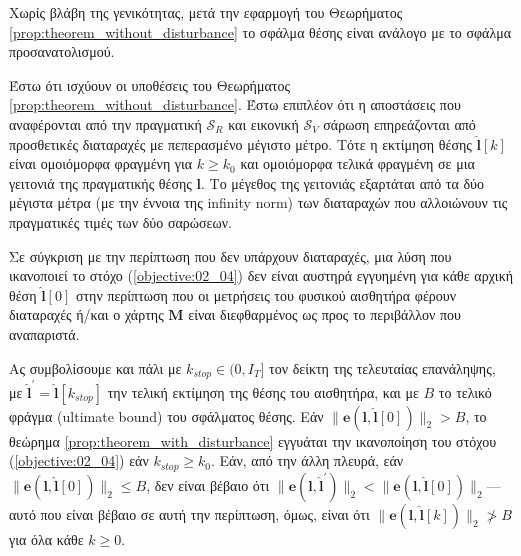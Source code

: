 \begin{gg_box}
\begin{remark}
  \label{remark:loc_prop_or}
  Χωρίς βλάβη της γενικότητας, μετά την εφαρμογή του Θεωρήματος
  \ref{prop:theorem_without_disturbance} το σφάλμα θέσης είναι ανάλογο με το
  σφάλμα προσανατολισμού.
\end{remark}
\end{gg_box}

\begin{bw_box}
\begin{theorem}
  \label{prop:theorem_with_disturbance}
  Έστω ότι ισχύουν οι υποθέσεις του Θεωρήματος
  \ref{prop:theorem_without_disturbance}. Έστω επιπλέον ότι η αποστάσεις που
  αναφέρονται από την πραγματική $\mathcal{S}_R$ και εικονική $\mathcal{S}_V$
  σάρωση επηρεάζονται από προσθετικές διαταραχές με πεπερασμένο μέγιστο μέτρο.
  Τότε η εκτίμηση θέσης $\hat{\bm{l}}[k]$ είναι ομοιόμορφα φραγμένη για $k \geq
  k_0$ και ομοιόμορφα τελικά φραγμένη σε μια γειτονιά της πραγματικής θέσης
  $\bm{l}$. Το μέγεθος της γειτονιάς εξαρτάται από τα δύο μέγιστα μέτρα
  (με την έννοια της infinity norm) των διαταραχών που αλλοιώνουν τις
  πραγματικές τιμές των δύο σαρώσεων.
\end{theorem}
\end{bw_box}

\begin{corollary}
  Σε σύγκριση με την περίπτωση που δεν υπάρχουν διαταραχές, μια λύση που
  ικανοποιεί το στόχο (\ref{objective:02_04}) δεν είναι αυστηρά εγγυημένη για
  κάθε αρχική θέση $\hat{\bm{l}}[0]$ στην περίπτωση που οι μετρήσεις του φυσικού
  αισθητήρα φέρουν διαταραχές ή/και ο χάρτης $\bm{M}$ είναι διεφθαρμένος ως προς
  το περιβάλλον που αναπαριστά.
\end{corollary}

Ας συμβολίσουμε και πάλι με $k_{stop} \in (0, I_T]$ τον δείκτη της τελευταίας
επανάληψης, με $\hat{\bm{l}}^{\prime} = \hat{\bm{l}}[k_{stop}]$ την τελική
εκτίμηση της θέσης του αισθητήρα, και με $B$ το τελικό φράγμα (ultimate bound)
του σφάλματος θέσης. Εάν $\|\bm{e}(\bm{l}, \hat{\bm{l}}[0])\|_2 > B$, το
θεώρημα \ref{prop:theorem_with_disturbance} εγγυάται την ικανοποίηση του στόχου
(\ref{objective:02_04}) εάν $k_{stop} \geq k_0$. Εάν, από την άλλη πλευρά, εάν
$\|\bm{e}(\bm{l}, \hat{\bm{l}}[0])\|_2 \leq B$, δεν είναι βέβαιο ότι
$\|\bm{e}(\bm{l}, \hat{\bm{l}}^{\prime})\|_2 < \|\bm{e}(\bm{l},
\hat{\bm{l}}[0])\|_2$---αυτό που είναι βέβαιο σε αυτή την περίπτωση, όμως,
είναι ότι $\|\bm{e}(\bm{l}, \hat{\bm{l}}[k])\|_2 \ngtr B$ για όλα κάθε $k \geq
0$.

